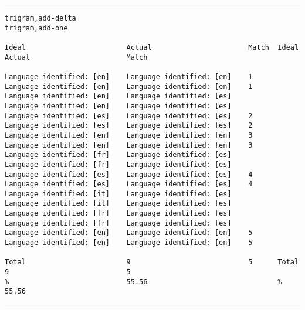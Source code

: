 \tiny
\hrule\vskip4pt
\begin{verbatim}
trigram,add-delta                                                trigram,add-one

Ideal                        Actual                       Match  Ideal                        Actual                       Match

Language identified: [en]    Language identified: [en]    1      Language identified: [en]    Language identified: [en]    1
Language identified: [en]    Language identified: [es]           Language identified: [en]    Language identified: [es]
Language identified: [es]    Language identified: [es]    2      Language identified: [es]    Language identified: [es]    2
Language identified: [en]    Language identified: [en]    3      Language identified: [en]    Language identified: [en]    3
Language identified: [fr]    Language identified: [es]           Language identified: [fr]    Language identified: [es]
Language identified: [es]    Language identified: [es]    4      Language identified: [es]    Language identified: [es]    4
Language identified: [it]    Language identified: [es]           Language identified: [it]    Language identified: [es]
Language identified: [fr]    Language identified: [es]           Language identified: [fr]    Language identified: [es]
Language identified: [en]    Language identified: [en]    5      Language identified: [en]    Language identified: [en]    5

Total                        9                            5      Total                        9                            5
%                            55.56                               %                            55.56
\end{verbatim}
\vskip4pt\hrule

\clearpage

